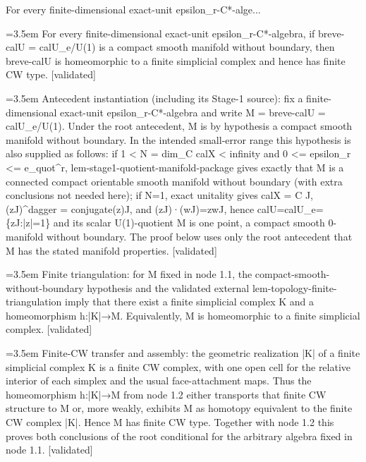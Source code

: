 \documentclass{article}
\newcommand{\step}[1]{\par\noindent\hangindent=3.5em\hangafter=1%
  \makebox[3.5em][l]{\textbf{#1.}}}
\newcommand{\steptag}[1]{\hfill{\small\textsf{[#1]}}}
\begin{document}
\begin{proofbox}{For every finite-dimensional exact-unit epsilon\_r-C*-alge...}
\step{1} For every finite-dimensional exact-unit epsilon\_r-C*-algebra, if breve-calU = calU\_e/U(1) is a compact smooth manifold without boundary, then breve-calU is homeomorphic to a finite simplicial complex and hence has finite CW type. \steptag{validated} \\[6pt]
\step{1.1} Antecedent instantiation (including its Stage-1 source): fix a finite-dimensional exact-unit epsilon\_r-C*-algebra and write M = breve-calU = calU\_e/U(1). Under the root antecedent, M is by hypothesis a compact smooth manifold without boundary. In the intended small-error range this hypothesis is also supplied as follows: if 1 < N = dim\_C calX < infinity and 0 <= epsilon\_r <= e\_quot\textasciicircum{}r, lem-stage1-quotient-manifold-package gives exactly that M is a connected compact orientable smooth manifold without boundary (with extra conclusions not needed here); if N=1, exact unitality gives calX = C J, (zJ)\textasciicircum{}dagger = conjugate(z)J, and (zJ)·(wJ)=zwJ, hence calU=calU\_e=\{zJ:|z|=1\} and its scalar U(1)-quotient M is one point, a compact smooth 0-manifold without boundary. The proof below uses only the root antecedent that M has the stated manifold properties. \steptag{validated} \\[4pt]
\step{1.2} Finite triangulation: for M fixed in node 1.1, the compact-smooth-without-boundary hypothesis and the validated external lem-topology-finite-triangulation imply that there exist a finite simplicial complex K and a homeomorphism h:|K|→M. Equivalently, M is homeomorphic to a finite simplicial complex. \steptag{validated} \\[4pt]
\step{1.3} Finite-CW transfer and assembly: the geometric realization |K| of a finite simplicial complex K is a finite CW complex, with one open cell for the relative interior of each simplex and the usual face-attachment maps. Thus the homeomorphism h:|K|→M from node 1.2 either transports that finite CW structure to M or, more weakly, exhibits M as homotopy equivalent to the finite CW complex |K|. Hence M has finite CW type. Together with node 1.2 this proves both conclusions of the root conditional for the arbitrary algebra fixed in node 1.1. \steptag{validated} \\[4pt]
\end{proofbox}
\end{document}
